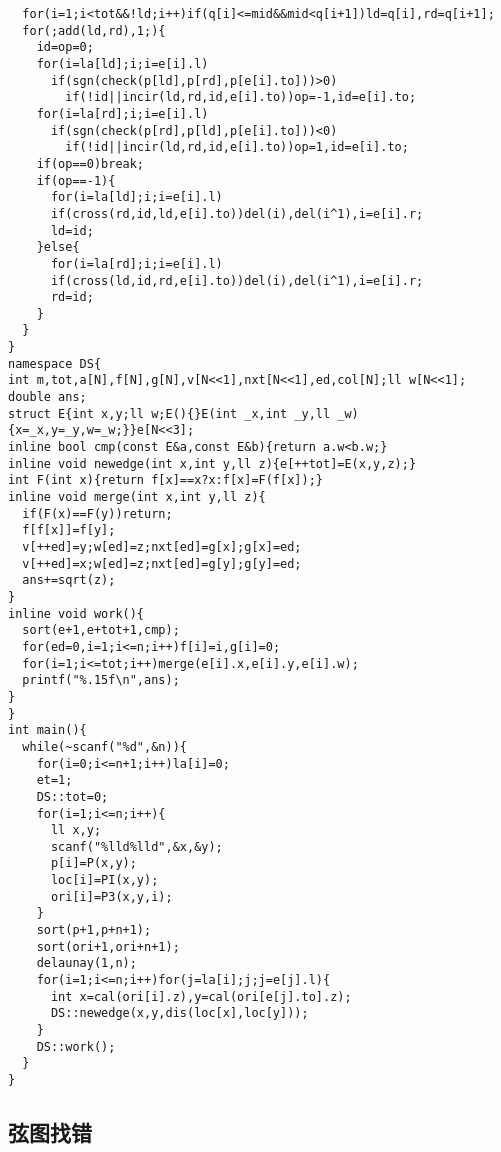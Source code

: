 \documentclass[12pt]{ctexart}
\begin{document}
\begin{lstlisting}
  for(i=1;i<tot&&!ld;i++)if(q[i]<=mid&&mid<q[i+1])ld=q[i],rd=q[i+1];
  for(;add(ld,rd),1;){
    id=op=0;
    for(i=la[ld];i;i=e[i].l)
      if(sgn(check(p[ld],p[rd],p[e[i].to]))>0)
        if(!id||incir(ld,rd,id,e[i].to))op=-1,id=e[i].to;
    for(i=la[rd];i;i=e[i].l)
      if(sgn(check(p[rd],p[ld],p[e[i].to]))<0)
        if(!id||incir(ld,rd,id,e[i].to))op=1,id=e[i].to;
    if(op==0)break;
    if(op==-1){
      for(i=la[ld];i;i=e[i].l)
      if(cross(rd,id,ld,e[i].to))del(i),del(i^1),i=e[i].r;
      ld=id;
    }else{
      for(i=la[rd];i;i=e[i].l)
      if(cross(ld,id,rd,e[i].to))del(i),del(i^1),i=e[i].r;
      rd=id;
    }
  }
}
namespace DS{
int m,tot,a[N],f[N],g[N],v[N<<1],nxt[N<<1],ed,col[N];ll w[N<<1];
double ans;
struct E{int x,y;ll w;E(){}E(int _x,int _y,ll _w){x=_x,y=_y,w=_w;}}e[N<<3];
inline bool cmp(const E&a,const E&b){return a.w<b.w;}
inline void newedge(int x,int y,ll z){e[++tot]=E(x,y,z);}
int F(int x){return f[x]==x?x:f[x]=F(f[x]);}
inline void merge(int x,int y,ll z){
  if(F(x)==F(y))return;
  f[f[x]]=f[y];
  v[++ed]=y;w[ed]=z;nxt[ed]=g[x];g[x]=ed;
  v[++ed]=x;w[ed]=z;nxt[ed]=g[y];g[y]=ed;
  ans+=sqrt(z);
}
inline void work(){
  sort(e+1,e+tot+1,cmp);
  for(ed=0,i=1;i<=n;i++)f[i]=i,g[i]=0;
  for(i=1;i<=tot;i++)merge(e[i].x,e[i].y,e[i].w);
  printf("%.15f\n",ans);
}
}
int main(){
  while(~scanf("%d",&n)){
    for(i=0;i<=n+1;i++)la[i]=0;
    et=1;
    DS::tot=0;
    for(i=1;i<=n;i++){
      ll x,y;
      scanf("%lld%lld",&x,&y);
      p[i]=P(x,y);
      loc[i]=PI(x,y);
      ori[i]=P3(x,y,i);
    }
    sort(p+1,p+n+1);
    sort(ori+1,ori+n+1);
    delaunay(1,n);
    for(i=1;i<=n;i++)for(j=la[i];j;j=e[j].l){
      int x=cal(ori[i].z),y=cal(ori[e[j].to].z);
      DS::newedge(x,y,dis(loc[x],loc[y]));
    }
    DS::work();
  }
}
\end{lstlisting}

\subsection{弦图找错}
\end{document}
